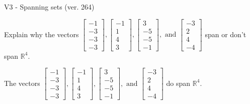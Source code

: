 \begin{exercise}
  \begin{exerciseTitle}V3 - Spanning sets (ver. 264)\end{exerciseTitle}
  \begin{exerciseStatement}
    Explain why the vectors \(\left[\begin{array}{r}
-1 \\
-3 \\
-3 \\
-3
\end{array}\right] , \left[\begin{array}{r}
-1 \\
1 \\
4 \\
3
\end{array}\right] , \left[\begin{array}{r}
3 \\
-5 \\
-5 \\
-1
\end{array}\right] , \text{ and } \left[\begin{array}{r}
-3 \\
2 \\
4 \\
-4
\end{array}\right]\) span or don't span \(\mathbb{R}^4\). 
	


  \end{exerciseStatement}
  \begin{exerciseAnswer}
   The vectors \(\left[\begin{array}{r}
-1 \\
-3 \\
-3 \\
-3
\end{array}\right] , \left[\begin{array}{r}
-1 \\
1 \\
4 \\
3
\end{array}\right] , \left[\begin{array}{r}
3 \\
-5 \\
-5 \\
-1
\end{array}\right] , \text{ and } \left[\begin{array}{r}
-3 \\
2 \\
4 \\
-4
\end{array}\right]\) 
  	 do  
	span \(\mathbb{R}^4\).
  


  \end{exerciseAnswer}
\end{exercise}
